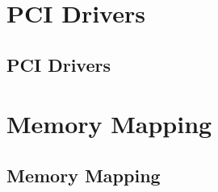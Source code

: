 \documentclass{beamer}
\begin{document}
\section{PCI Drivers}
\subsection{PCI Drivers}

\section{Memory Mapping}
\subsection{Memory Mapping}

\end{document}
